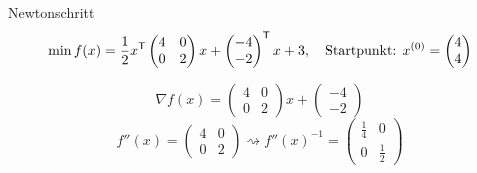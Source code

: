 \begin{Beispiel}{Newtonschritt\\}
\[\min f(x) = \frac{1}{2}x^\mathsf{T} \begin{pmatrix}
4 & 0 \\
0 & 2
\end{pmatrix}x + \begin{pmatrix}
-4 \\
-2
\end{pmatrix}^\mathsf{T} x + 3,\quad \text{Startpunkt: }
x^{(0)} = \begin{pmatrix}
4 \\
4
\end{pmatrix}\]



\[\nabla f(x) = \begin{pmatrix}
4 & 0 \\
0 & 2
\end{pmatrix} x + \begin{pmatrix}
-4 \\
-2
\end{pmatrix}\]
\[f''(x) = \begin{pmatrix}
4 & 0 \\
0 & 2
\end{pmatrix} \rightsquigarrow f''(x)^{-1} = \begin{pmatrix}
\frac{1}{4} & 0 \\
0 & \frac{1}{2}
\end{pmatrix}\]


\end{Beispiel}
